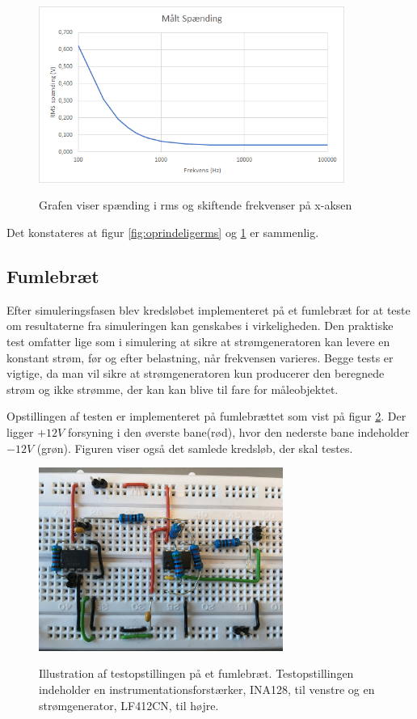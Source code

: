 \begin{figure}[H]
\centering
{\includegraphics[width=10cm]
{Figure/testopstilling1multisimVRMSgraf}}
\caption{Grafen viser spænding i rms og skiftende frekvenser på x-aksen} 
\label{fig:testopstilling1multisimVRMSgraf}
\end{figure}


Det konstateres at figur \ref{fig:oprindeligerms} og  \ref{fig:testopstilling1multisimVRMSgraf} er sammenlig.   



\pagebreak


\subsection{Fumlebræt}

Efter simuleringsfasen blev kredsløbet implementeret på et fumlebræt for at teste om resultaterne fra simuleringen kan genskabes i virkeligheden. Den praktiske test omfatter lige som i simulering at sikre at strømgeneratoren kan levere en konstant strøm, før og efter belastning, når frekvensen varieres. Begge tests er vigtige, da man vil sikre at strømgeneratoren kun producerer den beregnede strøm og ikke strømme, der kan kan blive til fare for måleobjektet.  


Opstillingen af testen er implementeret på fumlebrættet som vist på figur \ref{fig:oprindeligekredslob2}. Der ligger $+12V$ forsyning i den øverste bane(rød), hvor den  nederste bane indeholder $-12V$ (grøn). Figuren viser også det samlede kredsløb, der skal testes.    


\begin{figure}[H]
\centering
{\includegraphics[width=8cm]
{Figure/oprindeligekredslob2}}
\caption{Illustration af testopstillingen på et fumlebræt. Testopstillingen indeholder en instrumentationsforstærker, INA128, til venstre og en strømgenerator, LF412CN, til højre.}
\label{fig:oprindeligekredslob2}
\end{figure}


